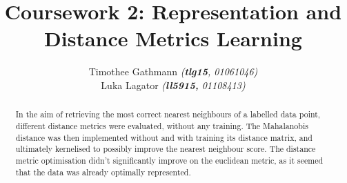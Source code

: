 \documentclass[10pt,technote]{IEEEtran}
\title{Coursework 2: Representation and Distance Metrics Learning }
\author{Timothee Gathmann \textit{(\textbf{tlg15}, 01061046)}\\ Luka Lagator\textit{ (\textbf{ll5915, }01108413)}}
\begin{document}
\maketitle
\begin{abstract}
In the aim of retrieving the most correct nearest neighbours of a labelled data point, different distance metrics were evaluated, without any training. The Mahalanobis distance was then implemented without and with training its distance matrix, and ultimately kernelised to possibly improve the nearest neighbour score. The distance metric optimisation didn't significantly improve on the euclidean metric, as it seemed that the data was already optimally represented.

\end{abstract}
\end{document}
